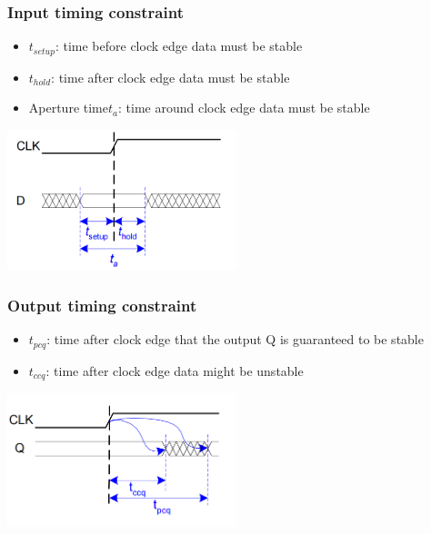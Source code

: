 \documentclass[12pt]{article}
\begin{document}
\subsubsection{Input timing constraint}
\begin{itemize}
    \item $t_{setup}$: time before clock edge data must be stable
    \item $t_{hold}$: time after clock edge data must be stable
    \item Aperture time$t_a$: time around clock edge data must be stable
\end{itemize}
\includegraphics[width=0.5\textwidth]{InputTimeConstraint.png}
\subsubsection{Output timing constraint}
\begin{itemize}
    \item $t_{pcq}$: time after clock edge that the output Q is guaranteed to be stable
    \item $t_{ccq}$: time after clock edge data might be unstable
\end{itemize}
\includegraphics[width=0.5\textwidth]{OutputTimeConstraint.png}
\end{document}
